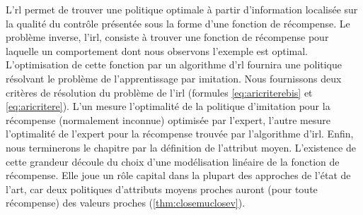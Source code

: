\documentclass[frenchb,a4paper,justified,notoc]{tufte-book}
\begin{document}
L'\gls{rl} permet de trouver une politique optimale à partir d'information localisée sur la qualité du contrôle présentée sous la forme d'une fonction de récompense. Le problème inverse, l'\gls{irl}, consiste à trouver une fonction de récompense pour laquelle un comportement dont nous observons l'exemple est optimal. L'optimisation de cette fonction par un algorithme d'\gls{rl} fournira une politique résolvant le problème de l'apprentissage par imitation. Nous fournissons deux critères de résolution du problème de l'\gls{irl} (formules \ref{eq:aricriterebis} et \ref{eq:aricritere}). L'un mesure l'optimalité de la politique d'imitation pour la récompense (normalement inconnue) optimisée par l'expert, l'autre mesure l'optimalité de l'expert pour la récompense trouvée par l'algorithme d'\gls{irl}. Enfin, nous terminerons le chapitre par la définition de l'attribut moyen. L'existence de cette grandeur découle du choix d'une modélisation linéaire de la fonction de récompense. Elle joue un rôle capital dans la plupart des approches de l'état de l'art, car deux politiques d'attributs moyens proches auront (pour toute récompense) des valeurs proches (\autoref{thm:closemuclosev}). 
\end{document}
